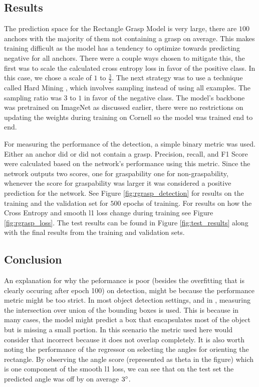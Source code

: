 \documentclass{article}
\begin{document}
\subsection{Results}
The prediction space for the Rectangle Grasp Model is very large, there are
$100$ anchors with the majority of them not containing a grasp on average.
This makes training difficult as the model has a tendency to optimize
towards predicting negative for all anchors. There were a couple ways chosen
to mitigate this, the first was to scale the calculated cross entropy loss
in favor of the positive class. In this case, we chose a scale of $1$ to
$\frac{3}{2}$. The next strategy was to use a technique called Hard Mining
\cite{liu15}, which involves sampling instead of
using all examples. The sampling ratio was $3$ to $1$ in favor of the
negative class. The model's backbone was pretrained on ImageNet as discussed
earlier, there were no restrictions on updating the weights during
training on Cornell so the model was trained end to end.

For measuring the performance of the detection, a simple binary metric was
used. Either an anchor did or did not contain a grasp. Precision, recall,
and F1 Score were calculated based on the network's performance using this
metric. Since the network outputs two scores, one for graspability one for
non-graspability, whenever the score for graspability was larger it was
considered a positive prediction for the network. See Figure
\ref{fig:rgrasp_detection} for results on the training and the validation
set for $500$ epochs of training. For results on how the Cross Entropy
and smooth l1 loss change during training see Figure \ref{fig:rgrasp_loss}.
The test results can be found in Figure \ref{fig:test_results} along with
the final results from the training and validation sets.

\subsection{Conclusion}
An explanation for why the peformance is poor (besides the overfitting
that is clearly occuring after epoch 100) on detection, might be because
the performance metric might be too strict. In most object detection settings,
and in \cite{zhou18, zhang18}, measuring the intersection over union of the
bounding boxes is used. This is because in many cases, the model might predict
a box that encapsulates most of the object but is missing a small portion. In
this scenario the metric used here would consider that incorrect because it
does not overlap completely. It is also worth noting the performance of the
regressor on selecting the angles for orienting the rectangle. By observing
the angle score (represented as theta in the figure) which is one component of
the smooth l1 loss, we can see that on the test set the predicted angle was off
by on average $3\degree$.
\end{document}
